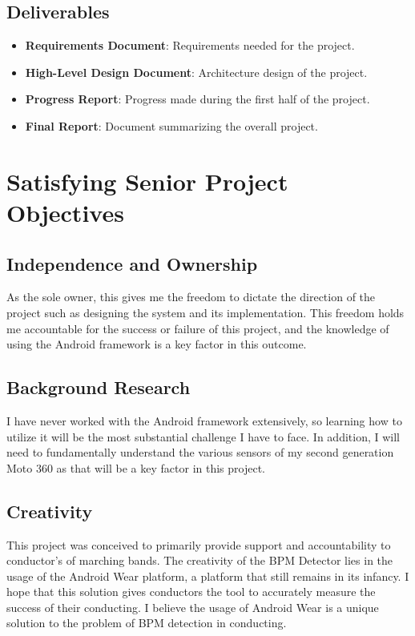 \documentclass[12pt]{article}
\begin{document}
\subsection{Deliverables}
\begin{itemize}
  \item \textbf{Requirements Document}: Requirements needed for the project.
  \item \textbf{High-Level Design Document}: Architecture design of the project.
  \item \textbf{Progress Report}: Progress made during the first half of the project.
  \item \textbf{Final Report}: Document summarizing the overall project.
\end{itemize}

\section{Satisfying Senior Project Objectives}

\subsection{Independence and Ownership}

As the sole owner, this gives me the freedom to dictate the direction of the project such as designing the system and its implementation. This freedom holds me accountable for the success or failure of this project, and the knowledge of using the Android framework is a key factor in this outcome.

\subsection{Background Research}

I have never worked with the Android framework extensively, so learning how to utilize it will be the most substantial challenge I have to face. In addition, I will need to fundamentally understand the various sensors of my second generation Moto 360 as that will be a key factor in this project.  

\subsection{Creativity}

This project was conceived to primarily provide support and accountability to conductor's of marching bands. The creativity of the BPM Detector lies in the usage of the Android Wear platform, a platform that still remains in its infancy. I hope that this solution gives conductors the tool to accurately measure the success of their conducting. I believe the usage of Android Wear is a unique solution to the problem of BPM detection in conducting.  
\end{document}
